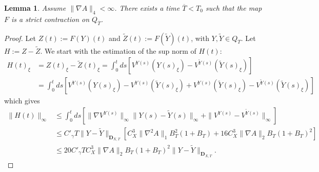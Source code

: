 \documentclass[a4paper,12pt,reqno]{amsart}
\newcommand{\wt}{\widetilde}
\newcommand{\norm}[1]{\|#1\|}
\newtheorem{lemma}{Lemma}
\newcommand{\DXT}{\mathbf{D}_{X,T}}
\begin{document}
\begin{lemma}
\label{lemma:uniqueness-rough}
 Assume $\|\nabla A\|_4 < \infty$.
There exists a time $\overline{T} < T_0$ such that the
map $F$ is a strict contraction on $Q_{\overline{T}}$.
\end{lemma}
\begin{proof}
Let $Z(t) := F(Y)(t)$
and $\wt Z (t) := F(\wt Y)(t)$, with $Y, \wt Y \in Q_{T}$.
Let $H := Z - \wt Z$.%
We start with the estimation of the sup norm of $H(t)$:
\begin{equation*}
  \begin{split}
 H(t)_\xi & =   Z(t)_\xi-\wt Z(t)_\xi   = \int_0^t ds \left[
V^{Y(s)}(Y(s)_\xi) - V^{\wt Y(s)}(\wt Y(s)_\xi)
\right]
\\ & =
\int_0^t ds \left[
V^{Y(s)}(Y(s)_\xi)- V^{Y(s)}(\wt Y(s)_\xi) + V^{Y(s)}(\wt Y(s)_\xi) - V^{\wt Y(s)}(\wt Y(s)_\xi)
\right]
  \end{split}
\end{equation*}
which gives
\begin{equation}
\label{eq:bound-h0}
  \begin{split}
 \norm{H(t)}_\infty & \le \int_0^t ds \left [\norm{\nabla V^{Y(s)}}_\infty
 \norm{Y(s)-\wt Y(s)}_\infty  + \norm{V^{Y(s)}-V^{\wt Y(s)}}_\infty
 \right]
\\ & \le C'_\gamma T \norm{Y-\wt Y}_{\DXT} \left[C_X^3 \norm{\nabla^2 A}_1
 B_T^2(1+B_T) + 16 C_X^3 \norm{\nabla A}_2 B_T(1+B_T)^2 \right]
\\ & \le 20 C'_\gamma T C_X^3 \norm{\nabla A}_2 B_T (1+B_T)^2 \norm{Y-\wt Y}_{\DXT}.
  \end{split}
\end{equation}


\end{proof}
\end{document}
